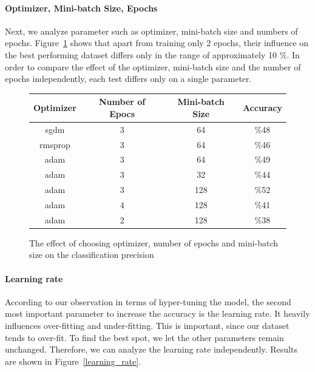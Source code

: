 \documentclass[twocolumn]{article}
\begin{document}
 
\paragraph{Optimizer, Mini-batch Size, Epochs}
Next, we analyze parameter such as optimizer, mini-batch size and numbers of epochs. Figure~\ref{model_param} shows that apart from training only 2 epochs, their influence on the best performing dataset differs only in the range of approximately 10 \%. In order to compare the effect of the optimizer, mini-batch size and the number of epochs independently, each test differs only on a single parameter. 

\begin{figure}
\begin{center}
 \begin{tabular}{|c|c|c|c|}
 \hline
 Optimizer&Number of Epocs&Mini-batch Size&Accuracy\\
 \hline
sgdm & 3 & 64 & \%48 \\
  \hline
rmsprop &   3 & 64 & \%46 \\  
  \hline adam  & 3 & 64 & \%49 \\
    \hline adam  & 3 & 32 & \%44 \\
    \hline adam  & 3 & 128 & \%52 \\
  \hline adam  & 4 & 128 & \%41 \\
  \hline adam  & 2 & 128 & \%38 \\

  \hline
 
\end{tabular}
\caption{The effect of choosing optimizer, number of epochs and mini-batch size on the classification precision}
\label{model_param}
\end{center}

\end{figure}

\paragraph{Learning rate}
According to our observation in terms of hyper-tuning the model, the second most important parameter to increase the accuracy is the learning rate. It heavily influences over-fitting and under-fitting. This is important, since our dataset tends to over-fit. To find the best spot, we let the other parameters remain unchanged. Therefore, we can analyze the learning rate independently. Results are shown in Figure~\ref{learning_rate}.
\end{document}
